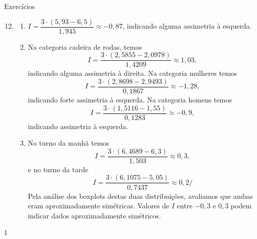 \begin{answer}{Exercícios}
{\exerciselist
  \begin{enumerate}\setcounter{enumi}{11}
  \item 
  \begin{enumerate}
  \item $I=\dfrac{3\cdot(5{,}93-6{,}5)}{1{,}945}\approx-0{,}87$, indicando alguma assimetria à esquerda.
  \item Na categoria cadeira de rodas, temos 
  \begin{equation*}
  I=\frac{3\cdot(2{,}5855-2{,}0978)}{1{,}4209}\approx1{,}03,
  \end{equation*}
  indicando alguma assimetria à direita. Na categoria mulheres temos 
  \begin{equation*}
  I=\frac{3\cdot(2{,}8698-2{,}9493)}{0{,}1867}\approx-1{,}28,
  \end{equation*}
  indicando forte assimetria à esquerda. Na categoria homens temos
  \begin{equation*}
  I=\frac{3\cdot(1{,}5116-1{,}55)}{0{,}1283}\approx-0{,}9,
  \end{equation*}
  indicando assimetria à esquerda.
  \item No turno da manhã temos
    \begin{equation*}
  I=\frac{3\cdot(6{,}4689-6{,}3)}{1{,}503}\approx0{,}3,
  \end{equation*}
  e no turno da tarde
  \begin{equation*}
  I=\frac{3\cdot(6{,}1075-5{,}05)}{0{,}7437}\approx0{,}2/
  \end{equation*}
  Pela análise dos boxplots destas duas distribuições, avaliamos que ambas eram aproximadamente simétricas. Valores de $I$ entre $-0{,}3$ e $0{,}3$ podem indicar dados aproximadamente simétricos.
  \end{enumerate}
  \end{enumerate}
}{1}
\end{answer}
